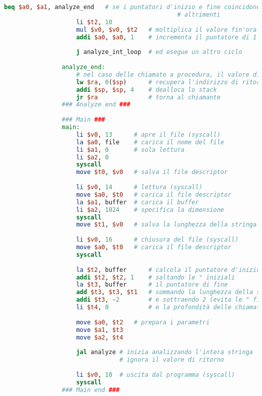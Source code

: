 \begin{center}
\begin{lstlisting}[language=mips, gobble=14, stepnumber=1]
                    beq $a0, $a1, analyze_end   # se i puntatori d'inizio e fine coincidono allora era l'ultimo carattere
                                                # altrimenti
                    li $t2, 10
                    mul $v0, $v0, $t2   # moltiplica il valore fin'ora calcolato per 10
                    addi $a0, $a0, 1    # incrementa il puntatore di 1 (prossimo carattere)
                    
                    j analyze_int_loop  # ed esegue un altro ciclo
                    
                analyze_end:
                    # nel caso delle chiamate a procedura, il valore di ritorno è lo stesso (valutazione dell'espressione)
                    lw $ra, 0($sp)      # recupera l'indirizzo di ritorno
                    addi $sp, $sp, 4    # dealloca lo stack
                    jr $ra              # torna al chiamante
                ### Analyze end ###
                
                ### Main ###
                main:
                    li $v0, 13      # apre il file (syscall)
                    la $a0, file    # carica il nome del file
                    li $a1, 0       # sola lettura
                    li $a2, 0
                    syscall
                    move $t0, $v0   # salva il file descriptor
                    
                    li $v0, 14      # lettura (syscall)
                    move $a0, $t0   # carica il file descriptor
                    la $a1, buffer  # carica il buffer
                    li $a2, 1024    # specifica la dimensione
                    syscall
                    move $t1, $v0   # salva la lunghezza della stringa
                    
                    li $v0, 16      # chiusura del file (syscall)
                    move $a0, $t0   # carica il file descriptor
                    syscall
                
                    la $t2, buffer      # calcola il puntatore d'inizio
                    addi $t2, $t2, 1    # saltando le " iniziali
                    la $t3, buffer      # il puntatore di fine
                    add $t3, $t3, $t1   # sommando la lunghezza della stringa
                    addi $t3, -2        # e sottraendo 2 (evita le " finali)
                    li $t4, 0           # e la profondità delle chiamate iniziale
                    
                    move $a0, $t2   # prepara i parametri
                    move $a1, $t3
                    move $a2, $t4
                    
                    jal analyze # inizia analizzando l'intera stringa
                                # ignora il valore di ritorno
                    
                    li $v0, 10  # uscita dal programma (syscall)
                    syscall
                ### Main end ###
           	\end{lstlisting}
        \end{center}
		